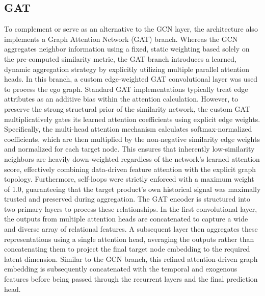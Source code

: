 \subsection{GAT}
To complement or serve as an alternative to the GCN layer, the architecture also implements a Graph Attention Network (GAT) branch. Whereas the GCN aggregates neighbor information using a fixed, static weighting based solely on the pre-computed similarity metric, the GAT branch introduces a learned, dynamic aggregation strategy by explicitly utilizing multiple parallel attention heads.  In this branch, a custom edge-weighted GAT convolutional layer was used to process the ego graph. Standard GAT implementations typically treat edge attributes as an additive bias within the attention calculation. However, to preserve the strong structural prior of the similarity network, the custom GAT multiplicatively gates its learned attention coefficients using explicit edge weights. Specifically, the multi-head attention mechanism calculates softmax-normalized coefficients, which are then multiplied by the non-negative similarity edge weights and normalized for each target node. This ensures that inherently low-similarity neighbors are heavily down-weighted regardless of the network's learned attention score, effectively combining data-driven feature attention with the explicit graph topology. Furthermore, self-loops were strictly enforced with a maximum weight of 1.0, guaranteeing that the target product's own historical signal was maximally trusted and preserved during aggregation.  The GAT encoder is structured into two primary layers to process these relationships. In the first convolutional layer, the outputs from multiple attention heads are concatenated to capture a wide and diverse array of relational features. A subsequent layer then aggregates these representations using a single attention head, averaging the outputs rather than concatenating them to project the final target node embedding to the required latent dimension. Similar to the GCN branch, this refined attention-driven graph embedding is subsequently concatenated with the temporal and exogenous features before being passed through the recurrent layers and the final prediction head.  

